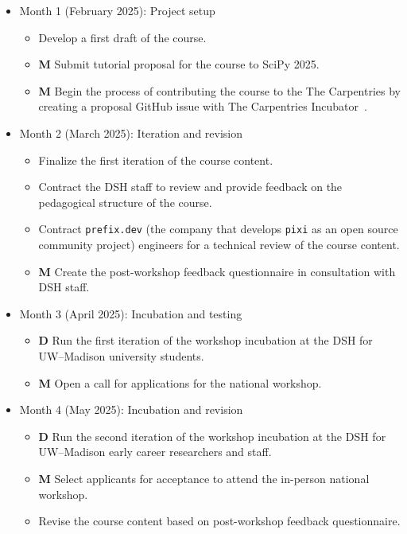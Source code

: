 \documentclass[letterpaper, 11pt]{article}
\newcommand{\institute}{UW--Madison}
\newcommand{\milestone}{\textbf{\textrm{M}}}
\newcommand{\deliverable}{\textbf{\textrm{D}}}
\begin{document}
\begin{itemize}
  \item Month 1 (February 2025): Project setup
    \begin{itemize}
      \item Develop a first draft of the course.
      \item \milestone{} Submit tutorial proposal for the course to SciPy 2025.
      \item \milestone{} Begin the process of contributing the course to the The Carpentries by creating a proposal GitHub issue with The Carpentries Incubator~\cite{carpentries_incubator_proposals}.
    \end{itemize}
  \item Month 2 (March 2025): Iteration and revision
    \begin{itemize}
      \item Finalize the first iteration of the course content.
      \item Contract the DSH staff to review and provide feedback on the pedagogical structure of the course.
      \item Contract \texttt{prefix.dev} (the company that develops \texttt{pixi} as an open source community project) engineers for a technical review of the course content.
      \item \milestone{} Create the post-workshop feedback questionnaire in consultation with DSH staff.
    \end{itemize}
  \item Month 3 (April 2025): Incubation and testing
    \begin{itemize}
      \item \deliverable{} Run the first iteration of the workshop incubation at the DSH for \institute{} university students.
      \item \milestone{} Open a call for applications for the national workshop.
    \end{itemize}
  \item Month 4 (May 2025): Incubation and revision
    \begin{itemize}
      \item \deliverable{} Run the second iteration of the workshop incubation at the DSH for \institute{} early career researchers and staff.
      \item \milestone{} Select applicants for acceptance to attend the in-person national workshop.
      \item Revise the course content based on post-workshop feedback questionnaire.

\end{itemize}
\end{itemize}
\end{document}
